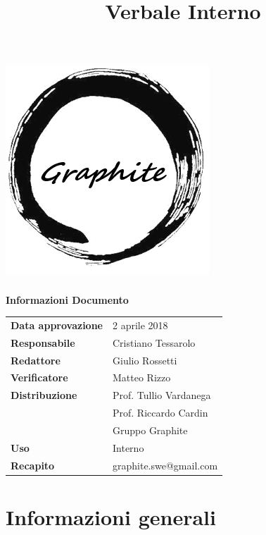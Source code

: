 \documentclass[openany,12pt,a4paper]{article}
\title{Verbale Interno}
\author{}
\begin{document}
 
  \makeatletter 
  \begin{titlepage} 
    \setlength{\headsep}{0pt}   
    \begin{center} 
      \includegraphics[width=0.5\linewidth]{Logo.png}\\[1em] 
      {\huge \bfseries  \@title }\\[10ex] 
      \textbf{\Large Informazioni Documento} \\[2em] 
      \bgroup 
      \def\arraystretch{1.5} 
      \begin{tabular}{l|l} 
        \textbf{Data approvazione} & 2 aprile 2018 \\ 
        \textbf{Responsabile} & Cristiano Tessarolo \\ 
        \textbf{Redattore} & Giulio Rossetti \\ 
        \textbf{Verificatore} & Matteo Rizzo \\ 
        \textbf{Distribuzione} & Prof. Tullio Vardanega \\ 
         & Prof. Riccardo Cardin \\ 
         & Gruppo Graphite \\ 
        \textbf{Uso} & Interno \\ 
        \textbf{Recapito} & graphite.swe@gmail.com \\ 
      \end{tabular} 
    \egroup 
    \end{center} 
  \end{titlepage} 
  \makeatother 
 
  \thispagestyle{empty} 
  \newpage 
   
  \tableofcontents 
  \newpage 
   
  \section{Informazioni generali} 
   
\end{document}
